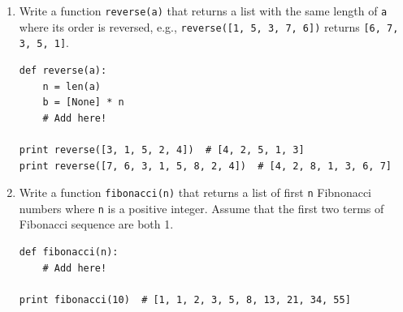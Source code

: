 \documentclass[../main.tex]{subfiles}
\begin{document}
\begin{enumerate}
\item Write a function \texttt{reverse(a)} that returns a list with the same length of \texttt{a} where its order is reversed, e.g., \texttt{reverse([1, 5, 3, 7, 6])} returns \texttt{[6, 7, 3, 5, 1]}.
\begin{verbatim}
def reverse(a):
	n = len(a)
	b = [None] * n
	# Add here!

print reverse([3, 1, 5, 2, 4])  # [4, 2, 5, 1, 3]
print reverse([7, 6, 3, 1, 5, 8, 2, 4])  # [4, 2, 8, 1, 3, 6, 7]
\end{verbatim}

\item Write a function \texttt{fibonacci(n)} that returns a list of first \texttt{n} Fibnonacci numbers where \texttt{n} is a positive integer.
Assume that the first two terms of Fibonacci sequence are both 1.
\begin{verbatim}
def fibonacci(n):
	# Add here!
	
print fibonacci(10)  # [1, 1, 2, 3, 5, 8, 13, 21, 34, 55]
\end{verbatim}


\end{enumerate}
\end{document}
